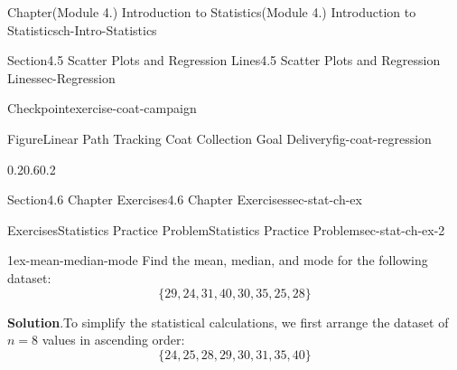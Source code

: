 \documentclass[oneside,10pt,]{book}
\newcommand{\blocktitlefont}{\relax}
\begin{document}
\begin{chapterptx}{Chapter}{(Module 4.) Introduction to Statistics}{}{(Module 4.) Introduction to Statistics}{}{}{ch-Intro-Statistics}
\begin{sectionptx}{Section}{4.5 Scatter Plots and Regression Lines}{}{4.5 Scatter Plots and Regression Lines}{}{}{sec-Regression}
\begin{inlineexercise}{Checkpoint}{}{exercise-coat-campaign}
\begin{figureptx}{Figure}{Linear Path Tracking Coat Collection Goal Delivery}{fig-coat-regression}{}%
\begin{image}{0.2}{0.6}{0.2}{}%
%
\end{image}%
\tcblower
\end{figureptx}%
\end{inlineexercise}%
\end{sectionptx}
%
%
\typeout{************************************************}
\typeout{************************************************}
%
\begin{sectionptx}{Section}{4.6 Chapter Exercises}{}{4.6 Chapter Exercises}{}{}{sec-stat-ch-ex}
%
%
\typeout{************************************************}
\typeout{************************************************}
%
\begin{exercises-subsection-numberless}{Exercises}{Statistics Practice Problem}{}{Statistics Practice Problem}{}{}{sec-stat-ch-ex-2}
\begin{divisionexercise}{1}{}{}{ex-mean-median-mode}%
Find the mean, median, and mode for the following dataset:%
\begin{equation*}
\{29, 24, 31, 40, 30, 35, 25, 28\}
\end{equation*}
%
\par\smallskip%
\noindent\textbf{\blocktitlefont Solution}.\hypertarget{ex-mean-median-mode-2}{}\quad{}To simplify the statistical calculations, we first arrange the dataset of \(n = 8\) values in ascending order:%
\begin{equation*}
\{24, 25, 28, 29, 30, 31, 35, 40\}
\end{equation*}
%
\par

\end{divisionexercise}
\end{exercises-subsection-numberless}
\end{sectionptx}
\end{chapterptx}
\end{document}
